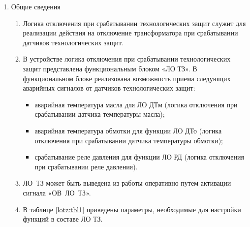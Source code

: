 
\color{black}


\begin{enumerate}

\item Общие сведения

\begin{enumerate}

\item
Логика отключения при срабатывании технологических защит служит для реализации действия на отключение трансформатора при срабатывании датчиков технологических защит.

\item
В устройстве логика отключения при срабатывании технологических защит представлена функциональным блоком «ЛО ТЗ». В функциональном блоке реализована возможность приема следующих аварийных сигналов от датчиков технологических защит:
\begin{itemize}
\item аварийная температура масла для ЛО ДТм (логика отключения при срабатывании датчика температуры масла);
\item аварийная температура обмотки для функции ЛО ДТо (логика отключения при срабатывании датчика температуры обмотки);
\item срабатывание реле давления для функции ЛО РД  (логика отключения при срабатывании реле давления).
\end{itemize}

\item
ЛО~ТЗ может быть выведена из работы оперативно путем активации сигнала «ОВ~ЛО~ТЗ».

\item
В таблице \ref{lotz:tbl1} приведены параметры, необходимые для настройки функций в составе ЛО ТЗ.


\end{enumerate}


\end{enumerate}
